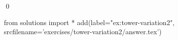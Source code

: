 
\begin{ex} 
  \label{ex:tower-variation2}
  
  \qed
\end{ex} 
\begin{python0}
from solutions import *
add(label="ex:tower-variation2",
    srcfilename='exercises/tower-variation2/answer.tex') 
\end{python0}
